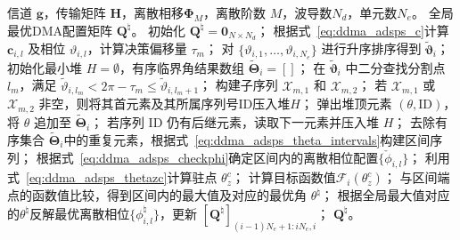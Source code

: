 \begin{algorithm}[!t]
	\caption{角域排序分划搜索算法（ADSPS）}
	\label{alg:ddma_adsps}
	\begin{algorithmic}[1]
		\REQUIRE 信道 $\bm g$，传输矩阵 $\bm H$，离散相移$\bm \Phi_M$，离散阶数 $M$，波导数$N_d$，单元数$N_e$。
		\ENSURE 全局最优DMA配置矩阵 $\bm Q^{\natural}$。
		\STATE 初始化 $\bm Q^{\natural} = \bm 0_{N \times N_d}$；
		\STATE 根据式~\eqref{eq:ddma_adsps_c}计算 $\bm c_{i,l}$ 及相位 $\vartheta_{i,l}$，计算决策偏移量 $\tau_m$；
		\STATE 对 $\{\vartheta_{i,1}, \dots, \vartheta_{i,N_e}\}$ 进行升序排序得到 $\tilde{\bm \vartheta}_i$；
		\STATE 初始化最小堆 $H = \emptyset$，有序临界角结果数组 $\tilde{\bm \Theta}_{i} = []$；
		\STATE 在 $\tilde{\bm \vartheta}_i$ 中二分查找分割点 $l_m$，满足 $\tilde\vartheta_{i,l_m} < 2\pi - \tau_m \le \tilde\vartheta_{i,l_m+1}$；
		\STATE 构建子序列 $\mathcal{X}_{m,1}$ 和 $\mathcal{X}_{m,2}$；
		\STATE 若 $\mathcal{X}_{m,1}$ 或 $\mathcal{X}_{m,2}$ 非空，则将其首元素及其所属序列号ID压入堆$H$；
		\ENDFOR
		\STATE 弹出堆顶元素 $(\theta, \text{ID})$，将 $\theta$ 追加至 $\tilde{\bm \Theta}_{i}$；
		\STATE 若序列 $\text{ID}$ 仍有后继元素，读取下一元素并压入堆 $H$；
		\ENDWHILE
		\STATE 去除有序集合 $\tilde{\bm \Theta}_{i}$中的重复元素，根据式~\eqref{eq:ddma_adsps_theta_intervals}构建区间序列；
		\FOR {每个有效区间$[\Theta_z, \Theta_{z+1})$}
		\STATE 根据式~\eqref{eq:ddma_adsps_checkphi}确定区间内的离散相位配置$\{\check{\phi}_{i,l}\}$；
		\STATE 利用式~\eqref{eq:ddma_adsps_thetazc}计算驻点 $\theta_z^c$；
		\STATE 计算目标函数值$\mathcal{F}_i(\theta_z^c)$；
		\ENDIF
		\STATE 与区间端点的函数值比较，得到区间内的最大值及对应的最优角 $\theta^{\natural}$；
		\ENDFOR
		\STATE 根据全局最大值对应的$\theta^{\natural}$反解最优离散相位$\{{\phi}_{i,l}^{\natural}\}$，更新 $[\bm Q^{\natural}]_{(i-1)N_e+1:iN_e, i}$；
		\ENDFOR
		\RETURN $\bm Q^{\natural}$。
	\end{algorithmic}
\end{algorithm}

